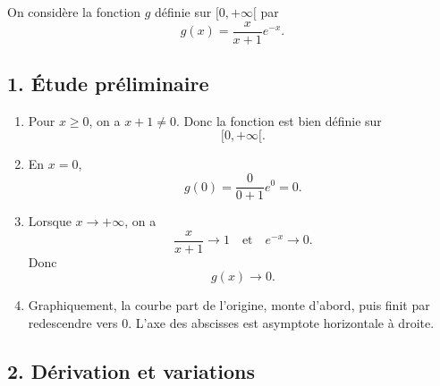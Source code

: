\documentclass[11pt,a4paper]{article}
\begin{document}
On considère la fonction \(g\) définie sur \([0,+\infty[\) par
\[
g(x)=\frac{x}{x+1}e^{-x}.
\]

\subsection*{1. Étude préliminaire}

\begin{enumerate}
    \item Pour \(x\geq 0\), on a \(x+1\neq 0\). Donc la fonction est bien définie sur
    \[
    [0,+\infty[.
    \]

    \item En \(x=0\),
    \[
    g(0)=\frac{0}{0+1}e^0=0.
    \]

    \item Lorsque \(x\to +\infty\), on a
    \[
    \frac{x}{x+1}\to 1
    \quad \text{et} \quad
    e^{-x}\to 0.
    \]
    Donc
    \[
    g(x)\to 0.
    \]

    \item Graphiquement, la courbe part de l'origine, monte d'abord, puis finit par redescendre vers \(0\). L'axe des abscisses est asymptote horizontale à droite.
\end{enumerate}

\subsection*{2. Dérivation et variations}
\end{document}
